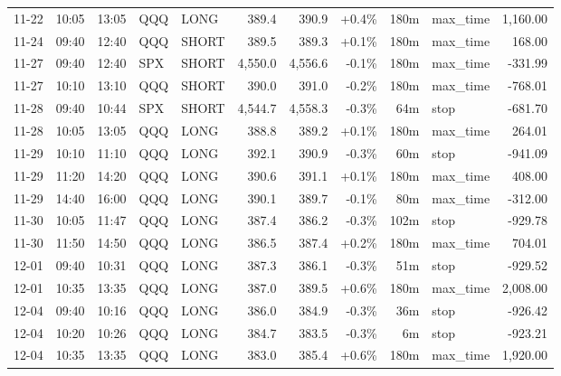 \documentclass[11pt,a4paper,twoside]{article}
\begin{document}
\begin{center}
\begin{longtable}{>{\color{txtmain}}l l l l l r r r r >{\color{txtmain}}l r}
11-22 & 10:05 & 13:05 & QQQ & LONG & 389.4 & 390.9 & \textcolor{wingreen}{+0.4\%} & 180m & max\_time & \textcolor{wingreen}{1,160.00} \\
11-24 & 09:40 & 12:40 & QQQ & SHORT & 389.5 & 389.3 & \textcolor{wingreen}{+0.1\%} & 180m & max\_time & \textcolor{wingreen}{168.00} \\
11-27 & 09:40 & 12:40 & SPX & SHORT & 4,550.0 & 4,556.6 & \textcolor{lossred}{-0.1\%} & 180m & max\_time & \textcolor{lossred}{-331.99} \\
11-27 & 10:10 & 13:10 & QQQ & SHORT & 390.0 & 391.0 & \textcolor{lossred}{-0.2\%} & 180m & max\_time & \textcolor{lossred}{-768.01} \\
11-28 & 09:40 & 10:44 & SPX & SHORT & 4,544.7 & 4,558.3 & \textcolor{lossred}{-0.3\%} & 64m & stop & \textcolor{lossred}{-681.70} \\
11-28 & 10:05 & 13:05 & QQQ & LONG & 388.8 & 389.2 & \textcolor{wingreen}{+0.1\%} & 180m & max\_time & \textcolor{wingreen}{264.01} \\
11-29 & 10:10 & 11:10 & QQQ & LONG & 392.1 & 390.9 & \textcolor{lossred}{-0.3\%} & 60m & stop & \textcolor{lossred}{-941.09} \\
11-29 & 11:20 & 14:20 & QQQ & LONG & 390.6 & 391.1 & \textcolor{wingreen}{+0.1\%} & 180m & max\_time & \textcolor{wingreen}{408.00} \\
11-29 & 14:40 & 16:00 & QQQ & LONG & 390.1 & 389.7 & \textcolor{lossred}{-0.1\%} & 80m & max\_time & \textcolor{lossred}{-312.00} \\
11-30 & 10:05 & 11:47 & QQQ & LONG & 387.4 & 386.2 & \textcolor{lossred}{-0.3\%} & 102m & stop & \textcolor{lossred}{-929.78} \\
11-30 & 11:50 & 14:50 & QQQ & LONG & 386.5 & 387.4 & \textcolor{wingreen}{+0.2\%} & 180m & max\_time & \textcolor{wingreen}{704.01} \\
12-01 & 09:40 & 10:31 & QQQ & LONG & 387.3 & 386.1 & \textcolor{lossred}{-0.3\%} & 51m & stop & \textcolor{lossred}{-929.52} \\
12-01 & 10:35 & 13:35 & QQQ & LONG & 387.0 & 389.5 & \textcolor{wingreen}{+0.6\%} & 180m & max\_time & \textcolor{wingreen}{2,008.00} \\
12-04 & 09:40 & 10:16 & QQQ & LONG & 386.0 & 384.9 & \textcolor{lossred}{-0.3\%} & 36m & stop & \textcolor{lossred}{-926.42} \\
12-04 & 10:20 & 10:26 & QQQ & LONG & 384.7 & 383.5 & \textcolor{lossred}{-0.3\%} & 6m & stop & \textcolor{lossred}{-923.21} \\
12-04 & 10:35 & 13:35 & QQQ & LONG & 383.0 & 385.4 & \textcolor{wingreen}{+0.6\%} & 180m & max\_time & \textcolor{wingreen}{1,920.00} \\

\end{longtable}
\end{center}
\end{document}
